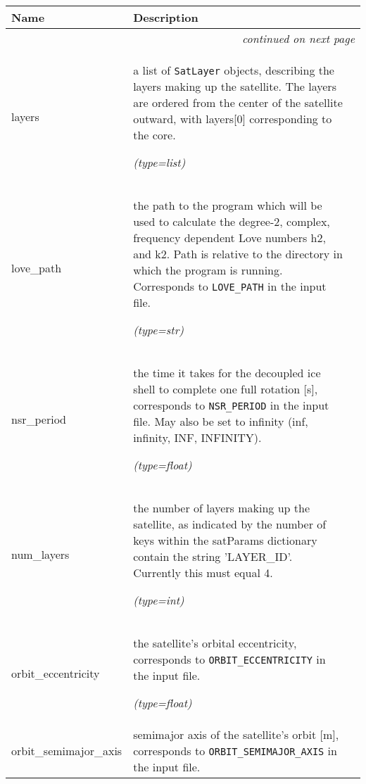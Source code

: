     \vspace{-1cm}
\hspace{\varindent}\begin{longtable}{|p{\varnamewidth}|p{\vardescrwidth}|l}
\cline{1-2}
\cline{1-2} \centering \textbf{Name} & \centering \textbf{Description}& \\
\cline{1-2}
\endhead\cline{1-2}\multicolumn{3}{r}{\small\textit{continued on next page}}\\\endfoot\cline{1-2}
\endlastfoot\raggedright l\-a\-y\-e\-r\-s\- & \raggedright a list of \texttt{SatLayer} objects, describing the layers making
          up the satellite.  The layers are ordered from the center of the 
          satellite outward, with layers[0] corresponding to the core.

            {\it (type=list)}&\\
\cline{1-2}
\raggedright l\-o\-v\-e\-\_\-p\-a\-t\-h\- & \raggedright the path to the program which will be used to calculate the 
          degree-2, complex, frequency dependent Love numbers h2, and k2.  
          Path is relative to the directory in which the program is 
          running.  Corresponds to \texttt{LOVE\_PATH} in the input file.

            {\it (type=str)}&\\
\cline{1-2}
\raggedright n\-s\-r\-\_\-p\-e\-r\-i\-o\-d\- & \raggedright the time it takes for the decoupled ice shell to complete one 
          full rotation [s], corresponds to \texttt{NSR\_PERIOD} in the 
          input file.  May also be set to infinity (inf, infinity, INF, 
          INFINITY).

            {\it (type=float)}&\\
\cline{1-2}
\raggedright n\-u\-m\-\_\-l\-a\-y\-e\-r\-s\- & \raggedright the number of layers making up the satellite, as indicated by the
          number of keys within the satParams dictionary contain the string
          'LAYER\_ID'.  Currently this must equal 4.

            {\it (type=int)}&\\
\cline{1-2}
\raggedright o\-r\-b\-i\-t\-\_\-e\-c\-c\-e\-n\-t\-r\-i\-c\-i\-t\-y\- & \raggedright the satellite's orbital eccentricity, corresponds to 
          \texttt{ORBIT\_ECCENTRICITY} in the input file.

            {\it (type=float)}&\\
\cline{1-2}
\raggedright o\-r\-b\-i\-t\-\_\-s\-e\-m\-i\-m\-a\-j\-o\-r\-\_\-a\-x\-i\-s\- & \raggedright semimajor axis of the satellite's orbit [m], corresponds to 
          \texttt{ORBIT\_SEMIMAJOR\_AXIS} in the input file.


\end{longtable}

